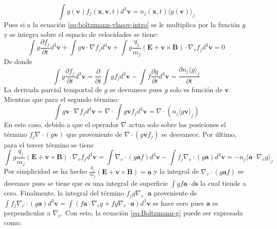 \documentclass[../tesis_main_file.tex]{subfiles}
\begin{document}
\begin{equation}
\int g(\textbf{v})f_j(\textbf{x},\textbf{v},t)d^3\textbf{v}= n_j(\textbf{x},t)\langle g(\textbf{v}) \rangle _j
\end{equation}
Pues si a la ecuación \ref{eq:boltzmann-vlasov-intro} se le multiplica por la función $g$ y se integra sobre el espacio de velocidades se tiene:
\begin{equation}
\label{eq:Boltzmann-g}
 \int g\frac{\partial f_j}{\partial t}d^3 \textbf{v}+ \int g\textbf{v}\cdot \nabla f_j d^3 \textbf{v} + \int g\frac{q_j}{m_j}\left( \textbf{E} + \textbf{v} \times \textbf{B}\right)\cdot \nabla _v f_j d^3 \textbf{v}=0
\end{equation}
De donde 
\begin{equation}
\int g\frac{\partial f_j}{\partial t}d^3 \textbf{v}=\frac{\partial}{\partial t}\int gf_jd^3\textbf{v}-\int f\frac{\partial g}{\partial t}d^3\textbf{v}=\frac{\partial n_j \langle g\rangle_j}{\partial t}
\end{equation}
La derivada parcial temportal de $g$ se desvanece pues $g$ solo es función de $\textbf{v}$.
Mientras que para el segundo término: 
\begin{equation}
\int g\textbf{v}\cdot \nabla f_j d^3 \textbf{v}= \nabla \cdot \int g\textbf{v}f_j d^3\textbf{v}=\nabla \cdot \left(n_j \langle g\textbf{v} \rangle_j \right)
\end{equation}
En este caso, debido a que el operador $\nabla$ actua solo sobre las posiciones el término $f_j \nabla \cdot (g\textbf{v})$ que proveniente de $\nabla \cdot (g\textbf{v}f_j)$ se desvanece.
Por último, para el tercer término se tiene
\begin{equation}
\int g\frac{q_j}{m_j}\left( \textbf{E} + \textbf{v} \times \textbf{B}\right)\cdot \nabla _v f_j d^3 \textbf{v}= \int \nabla_v\cdot (g\textbf{a}f)d^3\textbf{v}- \int f_j \nabla_v\cdot (g\textbf{a})d^3\textbf{v}=-n_j\langle \textbf{a}\cdot \nabla_v g\rangle_j
\end{equation}
Por simplicidad se ha hecho $\frac{q_j}{m_j}\left( \textbf{E} + \textbf{v} \times \textbf{B}\right)=\textbf{a}$ y la integral de $\nabla_v\cdot (g\textbf{a}f)$ se desvance pues se tiene que es una integral de superficie $\int gf\textbf{a}\cdot d\textbf{s}$ la cual tiende a cero. Finalmente, la integral  del término $f_jg\nabla_v \cdot \textbf{a}$ proveniente de $\int f_j\nabla _v \cdot (g\textbf{a})d^3\textbf{v} = \int (f\textbf{a} \cdot \nabla_v g + fg\nabla_v \cdot \textbf{a})d^3\textbf{v}$ se hace cero pues $\textbf{a}$ es perpendicular a $\nabla_v$. Con esto, la ecuación \ref{eq:Boltzmann-g} puede ser expresada como:
\end{document}
